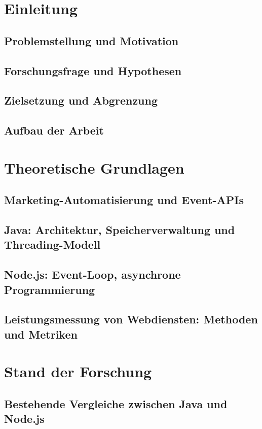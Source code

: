 \documentclass[a4paper, 12pt, oneside]{book}
\begin{document}


\tableofcontents
\clearpage

\chapter{Einleitung}
\section{Problemstellung und Motivation}
\section{Forschungsfrage und Hypothesen}
\section{Zielsetzung und Abgrenzung}
\section{Aufbau der Arbeit}

\chapter{Theoretische Grundlagen}
\section{Marketing-Automatisierung und Event-APIs}
\section{Java: Architektur, Speicherverwaltung und Threading-Modell}
\section{Node.js: Event-Loop, asynchrone Programmierung}
\section{Leistungsmessung von Webdiensten: Methoden und Metriken}

\chapter{Stand der Forschung}
\section{Bestehende Vergleiche zwischen Java und Node.js}
\end{document}
